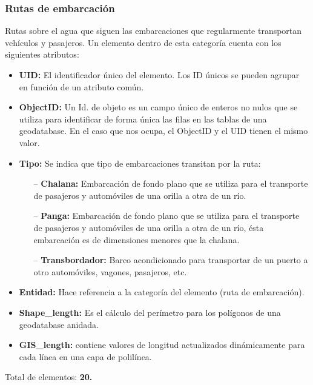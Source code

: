 \documentclass[10pt,letterpaper]{article}
\newcommand{\descripcion}{Un elemento dentro de esta categoría cuenta con los siguientes atributos:}
\newcommand{\total}{Total de elementos: }
\newcommand{\UID}{\textbf{UID:} El identificador único del elemento. Los ID únicos se pueden agrupar en función de un atributo común.}
\newcommand{\OID}{\textbf{ObjectID:} Un Id. de objeto es un campo único de enteros no nulos que se utiliza para identificar de forma única las filas en las tablas de una geodatabase. En el caso que nos ocupa, el ObjectID y el UID tienen el mismo valor.}
\newcommand{\ent}{\textbf{Entidad:} Hace referencia a la categoría del elemento }
\newcommand{\SHL}{\textbf{Shape\_length:} Es el cálculo del perímetro para los polígonos de una geodatabase anidada.}
\newcommand{\GISL}{\textbf{GIS\_length:} contiene valores de longitud actualizados dinámicamente para cada línea en una capa de polilínea.}
\begin{document}
\subsubsection{Rutas de embarcación}
Rutas sobre el agua que siguen las embarcaciones que regularmente transportan vehículos y pasajeros. \descripcion
\begin{itemize}
	\item \UID
	\item \OID
	\item \textbf{Tipo:} Se indica que tipo de embarcaciones transitan por la ruta:
	\begin{itemize}
		\item[--] \textbf{Chalana:} Embarcación de fondo plano que se utiliza para el transporte de pasajeros y automóviles de una orilla a otra de un río.
		\item[--] \textbf{Panga:} Embarcación de fondo plano que se utiliza para el transporte de pasajeros y automóviles de una orilla a otra de un río, ésta embarcación es de dimensiones menores que la chalana.
		\item[--] \textbf{Transbordador:} Barco acondicionado para transportar de un puerto a otro automóviles, vagones, pasajeros, etc. 
	\end{itemize}
	\item \ent (ruta de embarcación).
	\item \SHL
	\item \GISL
\end{itemize}
\total \textbf{20.}

\end{document}
